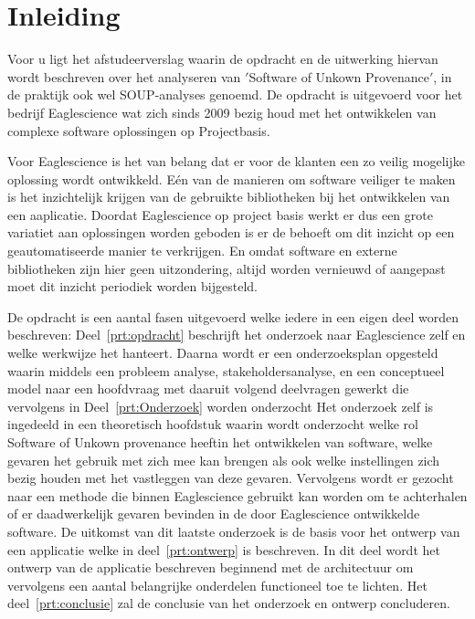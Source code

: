 
\chapter{Inleiding}\label{ch:inleiding}

Voor u ligt het afstudeerverslag waarin de opdracht en de uitwerking hiervan wordt beschreven over het analyseren van $'$Software of Unkown Provenance$'$, in de praktijk ook wel SOUP-analyses genoemd. De opdracht is uitgevoerd voor het bedrijf Eaglescience wat zich sinds 2009 bezig houd met het ontwikkelen van complexe software oplossingen op Projectbasis.

Voor Eaglescience is het van belang dat er voor de klanten een zo veilig mogelijke oplossing wordt ontwikkeld. Eén van de manieren om software veiliger te maken is het inzichtelijk krijgen van de gebruikte bibliotheken bij het ontwikkelen van een aaplicatie. Doordat Eaglescience op project basis werkt er dus een grote variatiet aan oplossingen worden geboden is er de behoeft om dit inzicht op een geautomatiseerde manier te verkrijgen. En omdat software en externe bibliotheken zijn hier geen uitzondering, altijd worden vernieuwd of aangepast moet dit inzicht periodiek worden bijgesteld.


De opdracht is een aantal fasen uitgevoerd welke iedere in een eigen deel worden beschreven:
Deel~\ref{prt:opdracht} beschrijft het onderzoek naar Eaglescience zelf en welke werkwijze het hanteert. Daarna wordt er een onderzoeksplan opgesteld waarin middels een probleem analyse, stakeholdersanalyse, en een conceptueel model naar een hoofdvraag met daaruit volgend deelvragen gewerkt die vervolgens in Deel~\ref{prt:Onderzoek} worden onderzocht Het onderzoek zelf is ingedeeld in een theoretisch hoofdstuk waarin wordt onderzocht welke rol Software of Unkown provenance heeftin het ontwikkelen van software, welke gevaren het gebruik met zich mee kan brengen als ook welke instellingen zich bezig houden met het vastleggen van deze gevaren. Vervolgens wordt er gezocht naar een methode die binnen Eaglescience gebruikt kan worden om te achterhalen of er daadwerkelijk gevaren bevinden in de door Eaglescience ontwikkelde software. De uitkomst van dit laatste onderzoek is de basis voor het ontwerp van een applicatie  welke in deel~\ref{prt:ontwerp} is beschreven. In dit deel wordt het ontwerp van de applicatie beschreven beginnend met de architectuur om vervolgens een aantal belangrijke onderdelen functioneel toe te lichten.
Het deel~\ref{prt:conclusie} zal de conclusie van het onderzoek en ontwerp concluderen.



